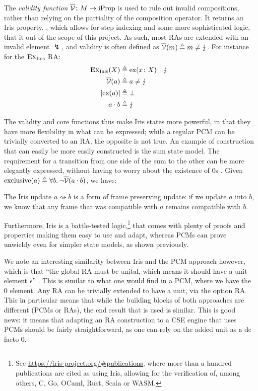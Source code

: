 The \emph{validity function} $\irisval\colon M\rarr \text{iProp}$ is used to rule out invalid compositions, rather than relying on the partiality of the composition operator. It returns an Iris property, , which allows for step indexing and some more sophisticated logic, that it out of the scope of this project. As such, most RAs are extended with an invalid element $\lightning$, and validity is often defined as $\irisval(m)\defeq m\neq \lightning$. For instance for the $\Ex_\Iris$ RA: \begin{align*}
	\Ex_\Iris(X) &\defeq \ex{x\colon X} ~|~ \lightning \\
	\irisval(a) &\defeq a \neq \lightning \\
	|\ex{a}| &\defeq \bot\\
	a \cdot b &\defeq \lightning
\end{align*}

The validity and core functions thus make Iris states more powerful, in that they have more flexibility in what can be expressed; while a regular PCM can be trivially converted to an RA, the opposite is not true. An example of construction that can easily be more easily constructed is the sum state model. The requirement for a transition from one side of the sum to the other can be more elegantly expressed, without having to worry about the existence of $0$s \cite{iris}. Given ${\text{exclusive}(a)\defeq \forall b\ldotp \neg\irisval(a\cdot b)}$, we have:\begin{mathpar}
\end{mathpar}

The Iris update $a \rightsquigarrow b$ is a form of frame preserving update: if we update $a$ into $b$, we know that any frame that was compatible with $a$ remains compatible with $b$.

Furthermore, Iris is a battle-tested logic,\footnote{See \url{https://iris-project.org/\#publications}, where more than a hundred publications are cited as using Iris, allowing for the verification of, among others, C, Go, OCaml, Rust, Scala or WASM.} that comes with plenty of proofs and properties making them easy to use and adapt, whereas PCMs can prove unwieldy even for simpler state models, as shown previously.

We note an interesting similarity between Iris and the PCM approach however, which is that ``the global RA must be unital, which means it should have a unit element $\epsilon$'' \cite{iris}. This is similar to what one would find in a PCM, where we have the $0$ element. Any RA can be trivially extended to have a unit, via the option RA. This in particular means that while the building blocks of both approaches are different (PCMs or RAs), the end result that is used is similar. This is good news: it means that adapting an RA construction to a CSE engine that uses PCMs should be fairly straightforward, as one can rely on the added unit as a de facto $0$.

